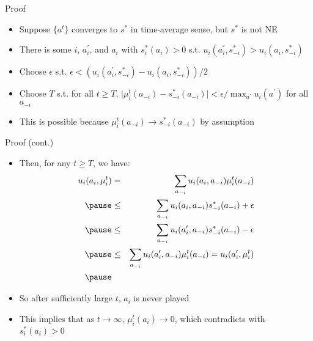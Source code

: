 \documentclass[11pt,aspectratio=169,handout]{beamer}
\begin{document}
  
  \begin{frame}{Proof}
   \begin{itemize}[<+->]
   \setlength{\itemsep}{1.2em}
    \item Suppose $\{a^t\}$ converges to $s^*$ in time-average sense, but $s^*$ is not NE
    \item There is some $i$, $a_i^\prime$, and $a_i$ with $s_i^*(a_i)>0$ s.t. $u_i(a_i^\prime,s_{-i}^*)>u_i(a_i,s_{-i}^*)$
    \item Choose $\epsilon$ s.t. $\epsilon < \left(u_i(a_i^\prime,s_{-i}^*) - u_i(a_i,s_{-i}^*)\right)/2$
    \item Choose $T$ s.t. for all $t\ge T$, $\vert \mu_i^t(a_{-i}) - s_{-i}^*(a_{-i}) \vert < \epsilon/\max_{a^\prime} u_i(a^\prime)$ for all $a_{-i}$
    \item This is possible because $\mu_i^t(a_{-i})\to s_{-i}^*(a_{-i})$ by assumption
   \end{itemize}
  \end{frame}
  
  
  \begin{frame}{Proof (cont.)}
   \begin{itemize}
    \item<1-> Then, for any $t \ge T$, we have:
    \begin{eqnarray*}
     u_i(a_i, \mu_i^t) & = & \sum_{a_{-i}}u_i(a_i, a_{-i})\mu_i^t(a_{-i}) \\ \pause
     & \le & \sum_{a_{-i}}u_i(a_i, a_{-i})s_{-i}^*(a_{-i}) + \epsilon \\ \pause
     & \le & \sum_{a_{-i}}u_i(a_i^\prime, a_{-i})s_{-i}^*(a_{-i}) - \epsilon \\ \pause
     & \le & \sum_{a_{-i}}u_i(a_i^\prime, a_{-i})\mu_i^t(a_{-i}) = u_i(a_i^\prime, \mu_i^t) \\ \pause
    \end{eqnarray*}
    \vspace{-2em}
    \item<5-> So after sufficiently large $t$, $a_i$ is never played
    \item<6-> This implies that as $t \to \infty$, $\mu_i^t(a_i)\to 0$, which contradicts with $s_i^*(a_i) > 0$
   \end{itemize}
  \end{frame}
  
\end{document}

